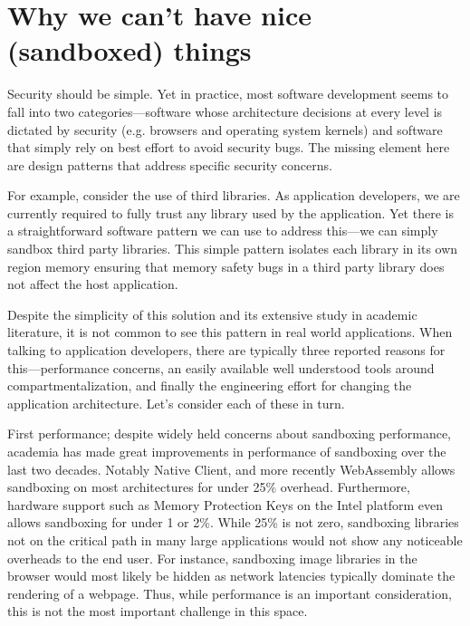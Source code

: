 \section{Why we can't have nice (sandboxed) things}


Security should be simple. Yet in practice, most software development seems to 
fall into two categories---software whose architecture decisions at every level 
is dictated by security (e.g. browsers and operating system kernels) and 
software that simply rely on best effort to avoid security bugs.
%
The missing element here are design patterns that address specific security 
concerns. 

For example, consider the use of third libraries.
%
As application developers, we are currently required to fully trust any library 
used by the application.
%
Yet there is a straightforward software pattern we can use to address this---we 
can simply sandbox third party libraries.
%
This simple pattern isolates each library in its own region memory ensuring 
that memory safety bugs in a third party library does not affect the host 
application.
%

Despite the simplicity of this solution and its extensive study in academic 
literature, it is not common to see this pattern in real world applications.
%
When talking to application developers, there are typically three reported 
reasons for this---performance concerns, an easily available well understood 
tools around compartmentalization, and finally the engineering effort for 
changing the application architecture.
%
Let's consider each of these in turn.

First performance; despite widely held concerns about sandboxing performance, 
academia has made great improvements in performance of sandboxing over 
the last two decades.
%
Notably Native Client, and more recently WebAssembly allows sandboxing on most 
architectures for under 25\% overhead.
%
Furthermore, hardware support such as Memory Protection Keys on the Intel 
platform even allows sandboxing for under 1 or 2\%.
%
While 25\% is not zero, sandboxing libraries not on the critical path in many 
large applications would not show any noticeable overheads to the end user.
%
For instance, sandboxing image libraries in the browser would most likely be 
hidden as network latencies typically dominate the rendering of a webpage.
%
Thus, while performance is an important consideration, this is not the most 
important challenge in this space.

